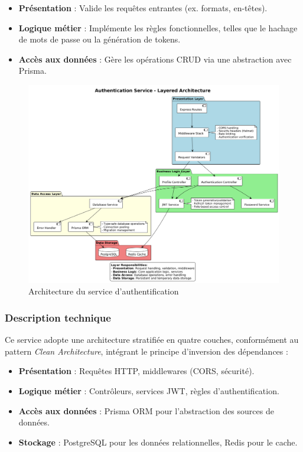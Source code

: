 \documentclass{rapportPfe}
\begin{document}
\begin{itemize}[label=--]
    \item \textbf{Présentation} : Valide les requêtes entrantes (ex. formats, en-têtes).
    \item \textbf{Logique métier} : Implémente les règles fonctionnelles, telles que le hachage de mots de passe ou la génération de tokens.
    \item \textbf{Accès aux données} : Gère les opérations CRUD via une abstraction avec Prisma.
\end{itemize}

\begin{figure}[htbp]
    \centering
    \includegraphics[width=1.1\textwidth]{diagrams/diagram2.png}
    \caption{Architecture du service d’authentification}
    \label{fig:diagram2}
\end{figure}

\subsubsection*{Description technique}

Ce service adopte une architecture stratifiée en quatre couches, conformément au pattern \textit{Clean Architecture}, intégrant le principe d’inversion des dépendances :

\begin{itemize}[label=--]
    \item \textbf{Présentation} : Requêtes HTTP, middlewares (CORS, sécurité).
    \item \textbf{Logique métier} : Contrôleurs, services JWT, règles d’authentification.
    \item \textbf{Accès aux données} : Prisma ORM pour l’abstraction des sources de données.
    \item \textbf{Stockage} : PostgreSQL pour les données relationnelles, Redis pour le cache.
\end{itemize}
\end{document}
